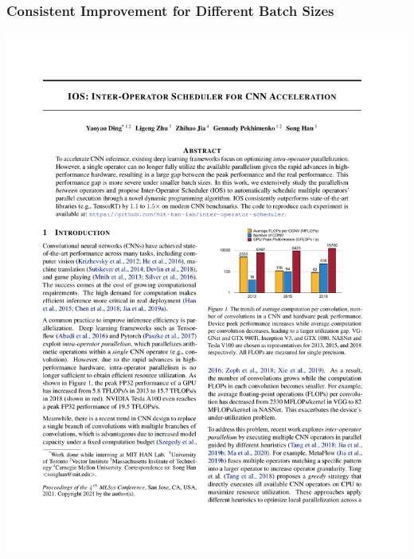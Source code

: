 \documentclass[12pt,aspectratio=169]{beamer}
\begin{document}
    \begin{frame}
        \frametitle{Consistent Improvement for Different Batch Sizes}

        \begin{center}
            \includegraphics[page=10,trim=1.8cm 10.7cm 11cm 13.2cm,clip,scale=1.1]{paper.pdf}
        \end{center}
    \end{frame}
\end{document}
